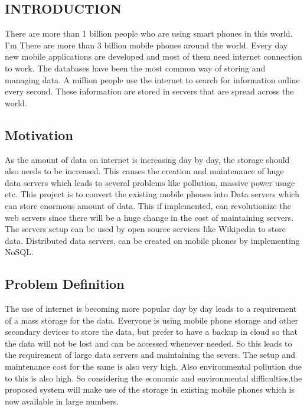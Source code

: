 \documentclass[12pt, a4paper]{article}
\begin{document}
\newpage

\tableofcontents
\listoffigures
\vfill
\newpage

\begin{center}
\section{INTRODUCTION}\vspace{5mm}
\end{center}
There are more than 1 billion people who are using smart phones in this world. I'm There are more than 3 billion mobile phones around the world. Every day new mobile applications are developed and most of them need internet connection to work. The databases have been the most common way of storing and managing data. A million people use the internet to search for information online every second. These information are stored in servers that are spread across the world. \\

\subsection{Motivation}
\hspace{5mm}As the amount of data on internet is increasing day by day, the storage should also needs to be increased. This causes the creation and maintenance of huge data servers which leads to several problems like pollution, massive power usage etc. This project is to convert the existing mobile phones into Data servers which can store enormous amount of data. This if implemented, can revolutionize the web servers since there will be a huge change in the cost of maintaining servers. The servers setup can be used by open source services like Wikipedia to store data. Distributed data servers, can be created on mobile phones by implementing NoSQL.
\\
\subsection{Problem Definition}
\hspace{5mm}The use of internet is becoming more popular day by day leads to a requirement of a mass storage for the data. Everyone is using mobile phone storage and other secondary devices to store the data, but prefer to have a backup in cloud so that the data will not be lost and can be accessed whenever needed. So this leads to the requirement of large data servers and maintaining the severs. The setup and maintenance cost for the same is also very high. Also environmental pollution due to this is also high. So considering the economic and environmental difficulties,the proposed system will make use of the storage in existing mobile phones which is now available in large numbers.
\end{document}
